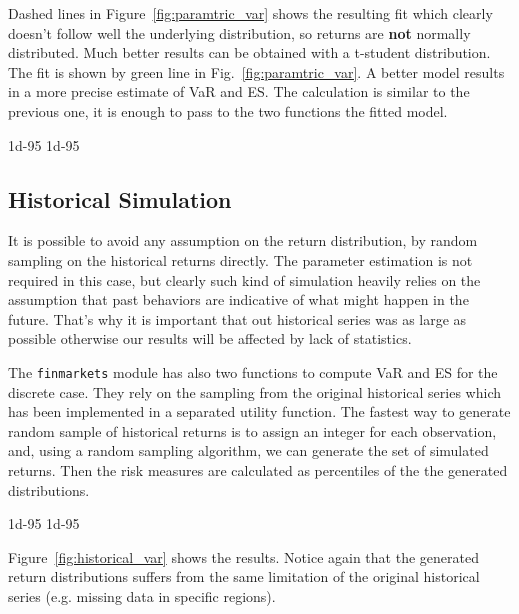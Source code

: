 Dashed lines in Figure~\ref{fig:paramtric_var} shows the resulting fit which clearly doesn't follow well the underlying distribution, so returns are \textbf{not} normally distributed. Much better results can be obtained with a t-student distribution. The fit is shown by green line in Fig.~\ref{fig:paramtric_var}. A better model results in a more precise estimate of VaR and ES. The calculation is similar to the previous one, it is enough to pass to the two functions the fitted model.

\begin{ioutput}
1d-95%
1d-95%
\end{ioutput}

\subsection{Historical Simulation}
\label{historical-simulation}

It is possible to avoid any assumption on the return distribution, by random sampling on the historical returns directly. The parameter estimation is not required in this case, but clearly such kind of simulation heavily relies on the assumption that past behaviors are indicative of what might happen in the future. That's why it is important that out historical series was as large as possible otherwise our results will be affected by lack of statistics. 

\begin{finmarkets}
The \texttt{finmarkets} module has also two functions to compute VaR and ES for the discrete case. 
They rely on the sampling from the original historical series which has been implemented in a separated utility function. The fastest way to generate random sample of historical returns is to assign an integer for each observation, and, using a random sampling algorithm, we can generate the set of simulated returns. Then the risk measures are calculated as percentiles of the the generated distributions. %
\end{finmarkets}

\begin{ioutput}
1d-95%
1d-95%
\end{ioutput}

Figure~\ref{fig:historical_var} shows the results. Notice again that the generated return distributions suffers from the same limitation of the original historical series (e.g. missing data in specific regions).

